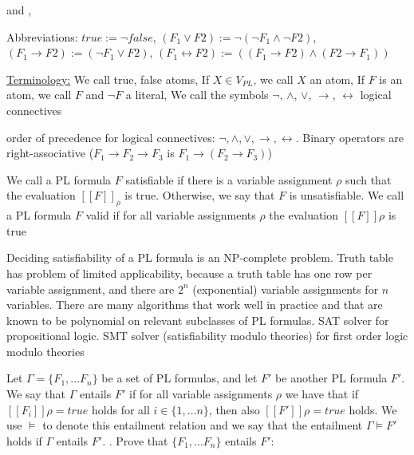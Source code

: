 \documentclass[landscape, a4paper]{article}
\begin{document}
\begin{minipage}[t]{0.2\linewidth}
	\begin{betterlist}
		\item {} and , 
		\begin{betterlist}
			\item \alert{Abbreviations:} $true := \neg false$, $(F_1 \lor F2 ) := \neg (\neg F_1 \land \neg F2)$, $(F_1 \rightarrow F2) := (\neg F_1 \lor F2)$, $(F_1 \leftrightarrow F2) := ((F_1 \rightarrow F2) \land (F2 \rightarrow F_1))$
			\item \underline{Terminology:} We call true, false \alert{atoms}, If $X \in V_{PL}$, we call $X$ an \alert{atom}, If $F$ is an atom, we call $F$ and $\neg F$ a \alert{literal}, We call the symbols $\neg$, $\wedge$, $\vee$, $\rightarrow$, $\leftrightarrow$ \alert{logical connectives}
			\item order of \alert{precedence} for logical connectives: $\neg, \land, \lor, \rightarrow, \leftrightarrow$. Binary operators are \alert{right-associative} ($F_1 \rightarrow F_2 \rightarrow F_3$ is $F_1 \rightarrow (F_2 \rightarrow F_3 )$)
		\end{betterlist}
		\item We call a PL formula $F$ \alert{satisfiable} if there is a variable assignment $\rho$ such that the evaluation $[[F]]_\rho$ is true. Otherwise, we say that $F$ is \alert{unsatisfiable}. We call a PL formula $F$ \alert{valid} if for all variable assignments $\rho$ the evaluation $[[F]]\rho$ is true
		\begin{betterlist}
			\item Deciding \alert{satisfiability} of a PL formula is an \alert{NP-complete} problem. \alert{Truth table} has problem of limited applicability, because a truth table has one row per variable assignment, and there are $2^n$ (exponential) variable assignments for $n$ variables. There are many algorithms that work well in practice and that are known to be \alert{polynomial} on relevant \alert{subclasses of PL formulas}. \alert{SAT solver} for propositional logic. \alert{SMT solver} (satisfiability modulo theories) for first order logic modulo theories
		\end{betterlist}
		\item Let $\Gamma = \{F_1, \ldots F_n\}$ be a set of PL formulas, and let $F'$ be another PL formula $F'$. We say that $\Gamma$ \alert{entails} $F'$ if for all variable assignments $\rho$ we have that if $[[F_i]]\rho = true$ holds for all $i \in \{1, \ldots n\}$, then also $[[F']]\rho = true$ holds. We use $\models$ to denote this entailment relation and we say that the entailment $\Gamma \models F'$ holds if $\Gamma$ entails $F'$. . Prove that $\{F_1, \ldots F_n\}$ entails $F'$:

\end{betterlist}
\end{minipage}
\end{document}
